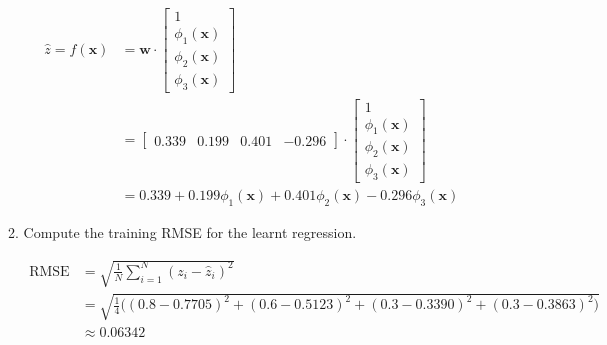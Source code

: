 \documentclass[12pt]{article}
\begin{document}
\begin{enumerate}[leftmargin=\labelsep]
\begin{enumerate}
        \begin{equation}
        \begin{split}
            \hat{z} = f(\mathbf{x}) &= \mathbf{w} \cdot
            \begin{bmatrix}
                1 \\
                \phi_1(\mathbf{x}) \\
                \phi_2(\mathbf{x}) \\
                \phi_3(\mathbf{x})
            \end{bmatrix} \\
            &= \begin{bmatrix}
                0.339 & 0.199 & 0.401 & -0.296
            \end{bmatrix} \cdot \begin{bmatrix}
                1 \\
                \phi_1(\mathbf{x}) \\
                \phi_2(\mathbf{x}) \\
                \phi_3(\mathbf{x})
            \end{bmatrix} \\
            &= 0.339 + 0.199\phi_1(\mathbf{x}) + 0.401\phi_2(\mathbf{x}) - 0.296\phi_3(\mathbf{x})
        \end{split}
        \end{equation}

        \item Compute the training RMSE for the learnt regression.
        
        \begin{equation}
        \begin{split}
            \textrm{RMSE} &= \sqrt{\frac{1}{N}\sum_{i=1}^{N}(z_i-\hat{z}_i)^2} \\
            &= \sqrt{\frac{1}{4}\biggl( (0.8-0.7705)^2 + (0.6-0.5123)^2 + (0.3-0.3390)^2 + (0.3-0.3863)^2\biggr)} \\
            &\approx 0.06342
        \end{split}
        \end{equation}
    \end{enumerate}


\end{enumerate}
\end{document}
